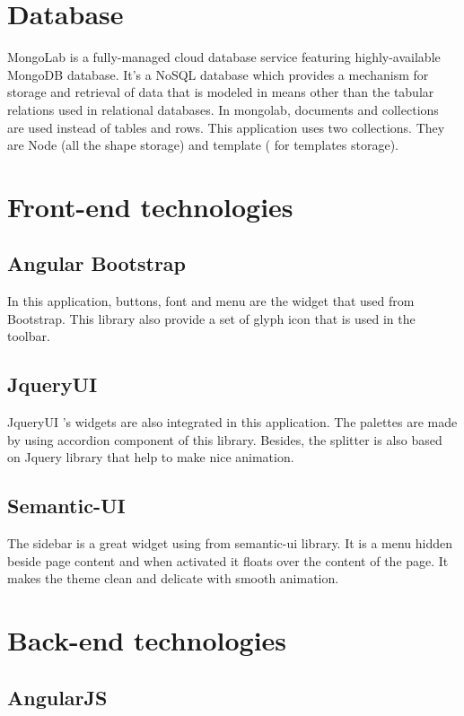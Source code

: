 \documentclass[14pt,a4paper]{extreport}
\begin{document}
	\section{Database}
		MongoLab is a fully-managed cloud database service featuring highly-available MongoDB database. It's a NoSQL database which provides a mechanism for storage and retrieval of data that is modeled in means other than the tabular relations used in relational databases.
		In mongolab, documents and collections are used instead of tables and rows. This application uses two collections. They are Node (all the shape storage) and template ( for templates storage).
	\section{Front-end technologies}
		\subsection{Angular Bootstrap}
			In this application, buttons, font and menu are the widget that used from Bootstrap. This library also provide a set of glyph icon that is used in the toolbar.
		\subsection{JqueryUI}
			JqueryUI 's widgets are also integrated in this application. The palettes are made by using accordion component of this library. Besides, the splitter is also based on Jquery library that help to make nice animation.
		\subsection{Semantic-UI}
			The sidebar is a great widget using from semantic-ui library. It is a menu hidden beside page content and when activated it floats over the content of the page. It makes the theme clean and delicate with smooth animation.
	\section{Back-end technologies}

		\subsection{AngularJS}
\end{document}
